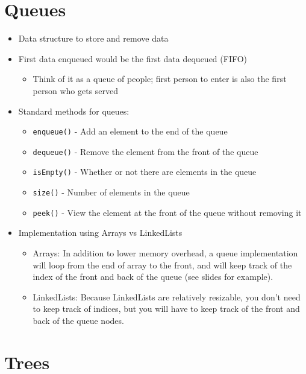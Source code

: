 \documentclass{article}
\begin{document}
\section{Queues}
\begin{itemize}
    \item Data structure to store and remove data
    \item First data enqueued would be the first data dequeued (FIFO)
        \begin{itemize}
            \item Think of it as a queue of people; first person to enter is also the first person who gets served
        \end{itemize}
    \item Standard methods for queues:
        \begin{itemize}
            \item \verb|enqueue()| - Add an element to the end of the queue
            \item \verb|dequeue()| - Remove the element from the front of the queue
            \item \verb|isEmpty()| - Whether or not there are elements in the queue
            \item \verb|size()| - Number of elements in the queue
            \item \verb|peek()| - View the element at the front of the queue without removing it
        \end{itemize}
    \item Implementation using Arrays vs LinkedLists
        \begin{itemize}
            \item Arrays: In addition to lower memory overhead, a queue implementation will loop from the end of array to the front, and will keep track of the index of the front and back of the queue (see slides for example).
            \item LinkedLists: Because LinkedLists are relatively resizable, you don't need to keep track of indices, but you will have to keep track of the front and back of the queue nodes.
        \end{itemize}
\end{itemize}

\section{Trees}
\end{document}
